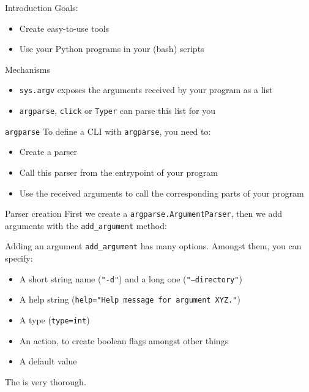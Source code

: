 \begin{frame}{Introduction}
  Goals:
  \begin{itemize}
    \item Create easy-to-use tools
    \item Use your Python programs in your (bash) scripts
  \end{itemize}
\end{frame}

\begin{frame}{Mechanisms}
  \begin{itemize}
    \item \texttt{sys.argv} exposes the arguments received by your program as a list
    \item \texttt{argparse}, \texttt{click} or \texttt{Typer} can parse this list for you
  \end{itemize}  
\end{frame}

\begin{frame}{\texttt{argparse}}
  To define a CLI with \texttt{argparse}, you need to:
  \begin{itemize}
    \item Create a parser
    \item Call this parser from the entrypoint of your program
    \item Use the received arguments to call the corresponding parts of your program
  \end{itemize}
\end{frame}

\begin{frame}{Parser creation}
  First we create a \texttt{argparse.ArgumentParser}, then we add arguments with the \texttt{add\_argument} method:
\end{frame}

\begin{frame}{Adding an argument}
  \texttt{add\_argument} has many options. Amongst them, you can specify:

  \begin{itemize}
    \item A short string name (\texttt{"-d"}) and a long one (\texttt{"--directory"})
    \item A help string (\texttt{help="Help message for argument XYZ."})
    \item A type (\texttt{type=int})
    \item An action, to create boolean flags amongst other things
    \item A default value
  \end{itemize}

  The  is very thorough.
\end{frame}

